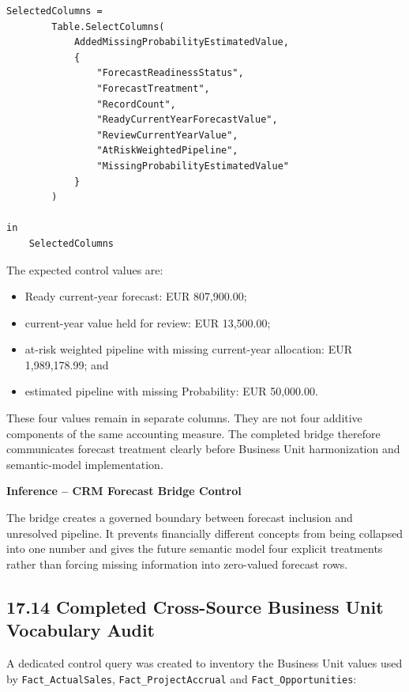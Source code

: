 \documentclass[11pt,a4paper]{article}
\begin{document}
\begin{lstlisting}[style=powerquery]
    SelectedColumns =
        Table.SelectColumns(
            AddedMissingProbabilityEstimatedValue,
            {
                "ForecastReadinessStatus",
                "ForecastTreatment",
                "RecordCount",
                "ReadyCurrentYearForecastValue",
                "ReviewCurrentYearValue",
                "AtRiskWeightedPipeline",
                "MissingProbabilityEstimatedValue"
            }
        )

in
    SelectedColumns
\end{lstlisting}

The expected control values are:

\begin{itemize}[leftmargin=7mm,itemsep=2pt]
    \item Ready current-year forecast: EUR 807,900.00;
    \item current-year value held for review: EUR 13,500.00;
    \item at-risk weighted pipeline with missing current-year allocation:
    EUR 1,989,178.99; and
    \item estimated pipeline with missing Probability: EUR 50,000.00.
\end{itemize}

These four values remain in separate columns. They are not four additive
components of the same accounting measure. The completed bridge therefore
communicates forecast treatment clearly before Business Unit harmonization and
semantic-model implementation.

\begin{inferencebox}

\textbf{Inference -- CRM Forecast Bridge Control}

The bridge creates a governed boundary between forecast inclusion and unresolved
pipeline. It prevents financially different concepts from being collapsed into
one number and gives the future semantic model four explicit treatments rather
than forcing missing information into zero-valued forecast rows.

\end{inferencebox}

\subsection{17.14 Completed Cross-Source Business Unit Vocabulary Audit}

A dedicated control query was created to inventory the Business Unit values used
by \texttt{Fact\_ActualSales}, \texttt{Fact\_ProjectAccrual} and
\texttt{Fact\_Opportunities}:
\end{document}
